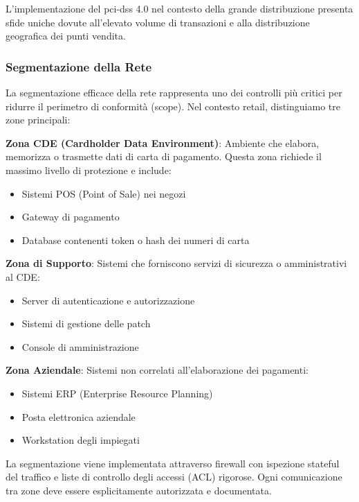 L'implementazione del \gls{pci-dss} 4.0 nel contesto della grande distribuzione presenta sfide uniche dovute all'elevato volume di transazioni e alla distribuzione geografica dei punti vendita.

\subsubsection{\texorpdfstring{Segmentazione della Rete}{4.4.1.1 - Segmentazione della Rete}}

La segmentazione efficace della rete rappresenta uno dei controlli più critici per ridurre il perimetro di conformità (scope). Nel contesto retail, distinguiamo tre zone principali:

\textbf{Zona CDE (Cardholder Data Environment)}: Ambiente che elabora, memorizza o trasmette dati di carta di pagamento. Questa zona richiede il massimo livello di protezione e include:
\begin{itemize}
    \item Sistemi POS (Point of Sale) nei negozi
    \item Gateway di pagamento
    \item Database contenenti token o hash dei numeri di carta
\end{itemize}

\textbf{Zona di Supporto}: Sistemi che forniscono servizi di sicurezza o amministrativi al CDE:
\begin{itemize}
    \item Server di autenticazione e autorizzazione
    \item Sistemi di gestione delle patch
    \item Console di amministrazione
\end{itemize}

\textbf{Zona Aziendale}: Sistemi non correlati all'elaborazione dei pagamenti:
\begin{itemize}
    \item Sistemi ERP (Enterprise Resource Planning)
    \item Posta elettronica aziendale
    \item Workstation degli impiegati
\end{itemize}

La segmentazione viene implementata attraverso firewall con ispezione stateful del traffico e liste di controllo degli accessi (ACL) rigorose. Ogni comunicazione tra zone deve essere esplicitamente autorizzata e documentata.

